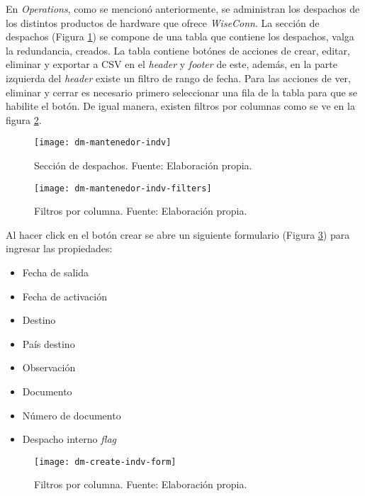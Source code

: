 
En \textit{Operations}, como se mencionó anteriormente, se administran los despachos de los distintos productos de hardware que ofrece \textit{WiseConn}.
La sección de despachos (Figura \ref{fig:dm-mantenedor-indv}) se compone de una tabla que contiene los despachos, valga la redundancia, creados. La tabla contiene botónes de acciones de crear, editar, eliminar y exportar a CSV en el \textit{header} y \textit{footer} de este, además, en la parte izquierda del \textit{header} existe un filtro de rango de fecha. 
Para las acciones de ver, eliminar y cerrar es necesario primero seleccionar una fila de la tabla para que se habilite el botón.
De igual manera, existen filtros por columnas como se ve en la figura \ref{fig:dm-mantenedor-indv-filters}.

\begin{figure}[H]
	\centering
	\texttt{[image: dm-mantenedor-indv]}
	\caption{\label{fig:dm-mantenedor-indv} Sección de despachos. Fuente: Elaboración propia.}
\end{figure}

\begin{figure}[H]
	\centering
	\texttt{[image: dm-mantenedor-indv-filters]}
	\caption{\label{fig:dm-mantenedor-indv-filters} Filtros por columna. Fuente: Elaboración propia.}
\end{figure}

Al hacer click en el botón crear se abre un siguiente formulario (Figura \ref{fig:dm-create-indv-form}) para ingresar las propiedades:
\begin{itemize}
    \item Fecha de salida
    \item Fecha de activación
    \item Destino
    \item País destino
    \item Observación
    \item Documento
    \item Número de documento
    \item Despacho interno \textit{flag}    
\end{itemize}

\begin{figure}[H]
	\centering
	\texttt{[image: dm-create-indv-form]}
	\caption{\label{fig:dm-create-indv-form} Filtros por columna. Fuente: Elaboración propia.}
\end{figure}

